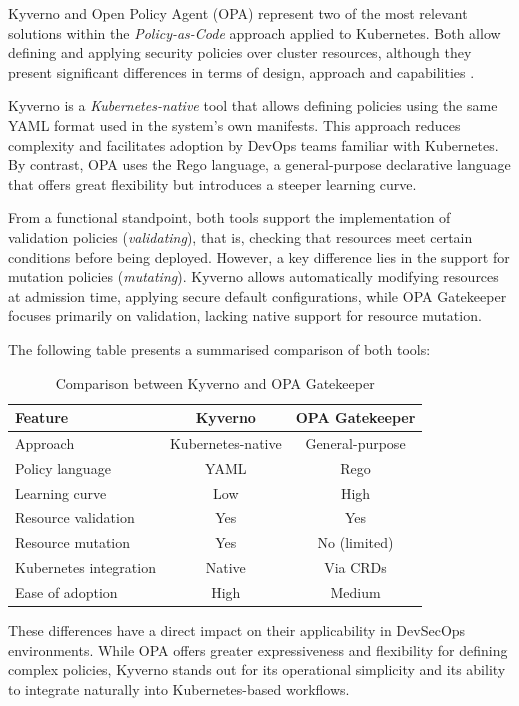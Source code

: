 Kyverno and Open Policy Agent (OPA) represent two of the most relevant solutions within the \textit{Policy-as-Code} approach applied to Kubernetes. Both allow defining and applying security policies over cluster resources, although they present significant differences in terms of design, approach and capabilities \cite{opa_docs, kyverno_docs}.

Kyverno is a \textit{Kubernetes-native} tool that allows defining policies using the same YAML format used in the system's own manifests. This approach reduces complexity and facilitates adoption by DevOps teams familiar with Kubernetes. By contrast, OPA uses the Rego language, a general-purpose declarative language that offers great flexibility but introduces a steeper learning curve.

From a functional standpoint, both tools support the implementation of validation policies (\textit{validating}), that is, checking that resources meet certain conditions before being deployed. However, a key difference lies in the support for mutation policies (\textit{mutating}). Kyverno allows automatically modifying resources at admission time, applying secure default configurations, while OPA Gatekeeper focuses primarily on validation, lacking native support for resource mutation.

The following table presents a summarised comparison of both tools:

\begin{table}[H]
\centering
\begin{tabular}{lcc}
\toprule
\textbf{Feature} & \textbf{Kyverno} & \textbf{OPA Gatekeeper} \\
\midrule
Approach & Kubernetes-native & General-purpose \\
Policy language & YAML & Rego \\
Learning curve & Low & High \\
Resource validation & Yes & Yes \\
Resource mutation & Yes & No (limited) \\
Kubernetes integration & Native & Via CRDs \\
Ease of adoption & High & Medium \\
\bottomrule
\end{tabular}
\caption{Comparison between Kyverno and OPA Gatekeeper}
\label{tab:kyverno-vs-opa}
\end{table}


These differences have a direct impact on their applicability in DevSecOps environments. While OPA offers greater expressiveness and flexibility for defining complex policies, Kyverno stands out for its operational simplicity and its ability to integrate naturally into Kubernetes-based workflows.

